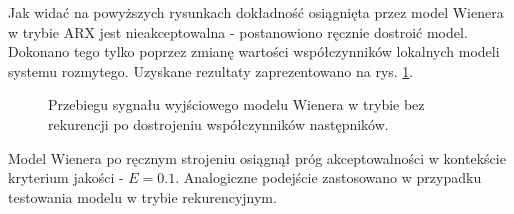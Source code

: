 Jak widać na powyższych rysunkach dokładność osiągnięta przez model Wienera w trybie ARX jest nieakceptowalna - postanowiono ręcznie dostroić model. Dokonano tego tylko poprzez zmianę wartości współczynników lokalnych modeli systemu rozmytego. Uzyskane rezultaty zaprezentowano na rys. \ref{wien_arx}.

\newpage

\begin{figure}[h!]
\centering
{}
\vfill
{}
\caption{Przebiegu sygnału wyjściowego modelu Wienera w trybie bez rekurencji po dostrojeniu współczynników następników.}
\label{wien_arx}
\end{figure}

Model Wienera po ręcznym strojeniu osiągnął próg akceptowalności w kontekście kryterium jakości - $E = \num{0.1}$. Analogiczne podejście zastosowano w przypadku testowania modelu w trybie rekurencyjnym.

\newpage

